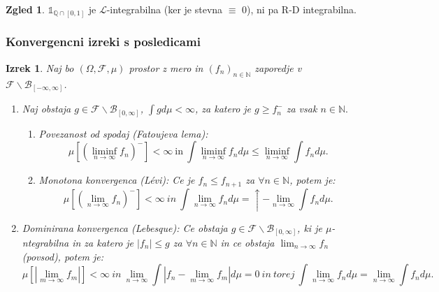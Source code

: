 \documentclass[a4paper,12pt]{article}
\theoremstyle{definition} %
\newtheorem{zgled}[definicija]{Zgled}
\theoremstyle{plain} %
\newtheorem{izrek}[definicija]{Izrek}
\newcommand{\N}{\mathbb{N}}
\newcommand{\F}{\mathcal{F}}
\begin{document}
            \begin{zgled}
                $\mathds{1}_{\mathbb{Q} \cap [0, 1]}$ je $\mathcal{L}$-integrabilna (ker je stevna $\equiv$ 0), ni pa R-D integrabilna.
            \end{zgled}
        \subsubsection{Konvergencni izreki s posledicami}
            \begin{izrek}
                Naj bo $(\Omega, \F, \mu)$ prostor z mero in $(f_n)_{n\in\N}$ zaporedje v $\F\backslash\mathcal{B}_{[-\infty, \infty]}$.
                \begin{enumerate}
                    \item Naj obstaja $g \in \F\backslash\mathcal{B}_{[0, \infty]}$, $\int gd\mu < \infty$, za katero je $g \geq f_n^-$ za vsak $n\in\N.$
                    \begin{enumerate}
                        \item Povezanost od spodaj (Fatoujeva lema):
                            $$
                                \mu\left[(\liminf_{n\rightarrow \infty}f_n)^-\right] < \infty \ \text{in} \
                                \int \liminf_{n\rightarrow \infty}f_n d\mu \leq \liminf_{n\rightarrow \infty}\int f_n d\mu.
                            $$
                        \item Monotona konvergenca (Lévi):
                            Ce je $f_n \leq f_{n+1}$ za $\forall n \in \N$, potem je:
                            $$
                                \mu\left[(\lim_{n\rightarrow \infty}f_n)^-\right] < \infty \ in \ \int\lim_{n\rightarrow\infty}f_nd\mu = \uparrow-\lim_{n\rightarrow\infty}\int f_nd\mu.
                            $$
                    \end{enumerate}
                    \item Dominirana konvergenca (Lebesque):
                        Ce obstaja $g \in \F\backslash\mathcal{B}_{[0, \infty]}$, ki je $\mu$-ntegrabilna in za katero je $|f_n| \leq g$ za $\forall n \in \N$ in ce obstaja $\lim_{n\rightarrow \infty}f_n$(povsod), potem je:
                        $$
                            \mu\left[|\lim_{m\rightarrow\infty}f_m|\right] < \infty \ in \ \lim_{n\rightarrow\infty}\int|f_n - \lim_{m\rightarrow\infty}f_m|d\mu = 0 \ in \ torej \ \int\lim_{n\rightarrow\infty}f_nd\mu = \lim_{n\rightarrow\infty}\int f_nd\mu.
                        $$
                \end{enumerate}
            \end{izrek}
\end{document}
